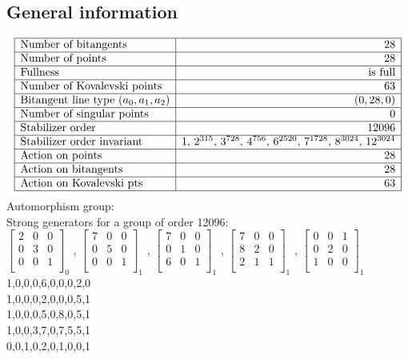 \documentclass{article}
\begin{document}
{\subsection*{General information}
{\renewcommand{\arraystretch}{1.5}
$$
\begin{array}{|l|r|}
\hline
\mbox{Number of bitangents} & 28\\
\hline
\mbox{Number of points} & 28\\
\hline
\mbox{Fullness} &  \mbox{is full}\\
\hline
\mbox{Number of Kovalevski points} & 63\\
\hline
\mbox{Bitangent line type $(a_0,a_1,a_2)$} & (0,
28,
0)\\
\hline
\mbox{Number of singular points} & 0\\
\hline
\mbox{Stabilizer order} & 12096\\
\hline
\mbox{Stabilizer order invariant} & 1,\,2^{315},\,3^{728},\,4^{756},\,6^{2520},\,7^{1728},\,8^{3024},\,12^{3024}\\
\hline
\mbox{Action on points} & 28\\
\hline
\mbox{Action on bitangents} & 28\\
\hline
\mbox{Action on Kovalevski pts} & 63\\
\hline
\end{array}
$$}
Automorphism group:\\
Strong generators for a group of order 12096:\\
$
\left[
\begin{array}{*{3}{r}}
2 & 0 & 0\\
0 & 3 & 0\\
0 & 0 & 1\\
\end{array}
\right]
_{0}
$
, 
$
\left[
\begin{array}{*{3}{r}}
7 & 0 & 0\\
0 & 5 & 0\\
0 & 0 & 1\\
\end{array}
\right]
_{1}
$
, 
$
\left[
\begin{array}{*{3}{r}}
7 & 0 & 0\\
0 & 1 & 0\\
6 & 0 & 1\\
\end{array}
\right]
_{1}
$
, 
$
\left[
\begin{array}{*{3}{r}}
7 & 0 & 0\\
8 & 2 & 0\\
2 & 1 & 1\\
\end{array}
\right]
_{1}
$
, 
$
\left[
\begin{array}{*{3}{r}}
0 & 0 & 1\\
0 & 2 & 0\\
1 & 0 & 0\\
\end{array}
\right]
_{1}
$
\\
1,0,0,0,6,0,0,0,2,0\\
1,0,0,0,2,0,0,0,5,1\\
1,0,0,0,5,0,8,0,5,1\\
1,0,0,3,7,0,7,5,5,1\\
0,0,1,0,2,0,1,0,0,1\\
}
\end{document}
